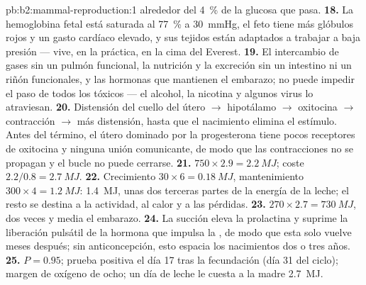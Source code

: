\begin{solution}{pb:b2:mammal-reproduction:1}
alrededor del \qty{4}{\%} de la glucosa que pasa.
\textbf{18.} La hemoglobina fetal está saturada al \qty{77}{\%} a
\qty{30}{mmHg}, el feto tiene más glóbulos rojos y un gasto cardíaco
elevado, y sus tejidos están adaptados a trabajar a baja presión --- vive,
en la práctica, en la cima del Everest.
\textbf{19.} El intercambio de gases sin un pulmón funcional, la nutrición
y la excreción sin un intestino ni un riñón funcionales, y las hormonas
que mantienen el embarazo; no puede impedir el paso de todos los tóxicos
--- el alcohol, la nicotina y algunos virus lo atraviesan.
\textbf{20.} Distensión del cuello del útero $\to$ hipotálamo $\to$
oxitocina $\to$ contracción $\to$ más distensión, hasta que el nacimiento
elimina el estímulo. Antes del término, el útero dominado por la
progesterona tiene pocos receptores de oxitocina y ninguna unión
comunicante, de modo que las contracciones no se propagan y el bucle no
puede cerrarse.
\textbf{21.} $750\times 2.9 = \qty{2.2}{MJ}$; coste $2.2/0.8 =
\qty{2.7}{MJ}$.
\textbf{22.} Crecimiento $30\times 6 = \qty{0.18}{MJ}$, mantenimiento
$300\times 4 = \qty{1.2}{MJ}$: \qty{1.4}{MJ}, unas dos terceras partes de
la energía de la leche; el resto se destina a la actividad, al calor y a
las pérdidas.
\textbf{23.} $270\times 2.7 = \qty{730}{MJ}$, dos veces y media el
embarazo.
\textbf{24.} La succión eleva la prolactina y suprime la liberación
pulsátil de la hormona que impulsa la , de modo que esta solo
vuelve meses después; sin anticoncepción, esto espacia los nacimientos
dos o tres años.
\textbf{25.} $P = 0.95$; prueba positiva el día 17 tras la fecundación
(día 31 del ciclo); margen de oxígeno de ocho; un día de leche le cuesta a
la madre \qty{2.7}{MJ}.
\end{solution}
